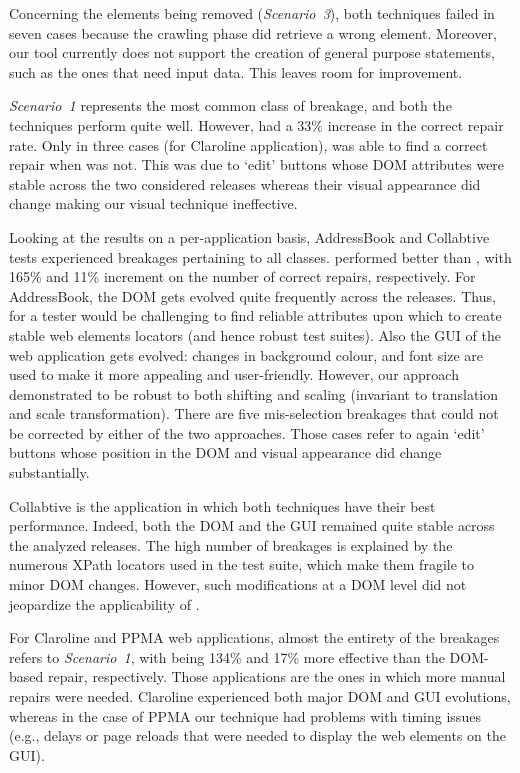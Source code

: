 Concerning the elements being removed (\textit{Scenario~3}), both techniques failed in seven cases because the crawling phase did retrieve a wrong element. Moreover, our tool currently does not support the creation of general purpose statements, such as the ones that need input data. This leaves room for improvement. 

\textit{Scenario~1} represents the most common class of breakage, and both the techniques perform quite well. However, \tool had a $33\%$ increase in the correct repair rate. Only in three cases (for Claroline application), \water was able to find a correct repair when \tool was not. This was due to `edit' buttons whose DOM attributes were stable across the two considered releases whereas their visual appearance did change making our visual technique ineffective.

Looking at the results on a per-application basis, AddressBook and Collabtive tests experienced breakages pertaining to all classes. 
\tool performed better than \water, with 165\% and 11\% increment on the number of correct repairs, respectively. 
For AddressBook, the DOM gets evolved quite frequently across the releases. Thus, for a tester would be challenging to find reliable attributes upon which to create stable web elements locators  (and hence robust test suites). Also the GUI of the web application gets evolved: changes in background colour, and font size are used to make it more appealing and user-friendly. However, our approach demonstrated to be robust to both shifting and scaling (invariant to translation and scale transformation). 
%
There are five mis-selection breakages that could not be corrected by either of the two approaches. Those cases refer to again `edit' buttons whose position in the DOM and visual appearance did change substantially. 

Collabtive is the application in which both techniques have their best performance. Indeed, both the DOM and the GUI remained quite stable across the analyzed releases. The high number of breakages is explained by the numerous XPath locators used in the test suite, which make them fragile to minor DOM changes. However, such modifications at a DOM level did not jeopardize the applicability of \water.

For Claroline and PPMA web applications, almost the entirety of the breakages refers to \textit{Scenario~1}, with \tool being 134\% and 17\% more effective than the DOM-based repair, respectively. Those applications are the ones in which more manual repairs were needed. Claroline experienced both major DOM and GUI evolutions, whereas in the case of PPMA our technique had problems with timing issues (e.g., delays or page reloads that were needed to display the web elements on the GUI).

